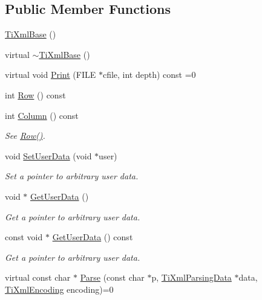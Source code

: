\subsection*{Public Member Functions}
\begin{DoxyCompactItemize}
\item 
\hyperlink{class_ti_xml_base_ac6753fe8a2c89669038fcf281cb301bf}{TiXmlBase} ()
\item 
virtual \hyperlink{class_ti_xml_base_ad1837ecb25a913612fa1115f090cbb56}{$\sim$TiXmlBase} ()
\item 
virtual void \hyperlink{class_ti_xml_base_a0de56b3f2ef14c65091a3b916437b512}{Print} (FILE $\ast$cfile, int depth) const =0
\item 
int \hyperlink{class_ti_xml_base_a024bceb070188df92c2a8d8852dd0853}{Row} () const 
\item 
int \hyperlink{class_ti_xml_base_ab54bfb9b70fe6dd276e7b279cab7f003}{Column} () const 
\begin{DoxyCompactList}\small\item\em See \hyperlink{class_ti_xml_base_a024bceb070188df92c2a8d8852dd0853}{Row()}. \item\end{DoxyCompactList}\item 
void \hyperlink{class_ti_xml_base_ac6b3e0f790930d4970ec30764e937b5d}{SetUserData} (void $\ast$user)
\begin{DoxyCompactList}\small\item\em Set a pointer to arbitrary user data. \item\end{DoxyCompactList}\item 
void $\ast$ \hyperlink{class_ti_xml_base_a6559a530ca6763fc301a14d77ed28c17}{GetUserData} ()
\begin{DoxyCompactList}\small\item\em Get a pointer to arbitrary user data. \item\end{DoxyCompactList}\item 
const void $\ast$ \hyperlink{class_ti_xml_base_ad0120210e4680ef2088601753ce0ede4}{GetUserData} () const 
\begin{DoxyCompactList}\small\item\em Get a pointer to arbitrary user data. \item\end{DoxyCompactList}\item 
virtual const char $\ast$ \hyperlink{class_ti_xml_base_a00e4edb0219d00a1379c856e5a1d2025}{Parse} (const char $\ast$p, \hyperlink{class_ti_xml_parsing_data}{TiXmlParsingData} $\ast$data, \hyperlink{tinyxml_8h_a88d51847a13ee0f4b4d320d03d2c4d96}{TiXmlEncoding} encoding)=0
\end{DoxyCompactItemize}
